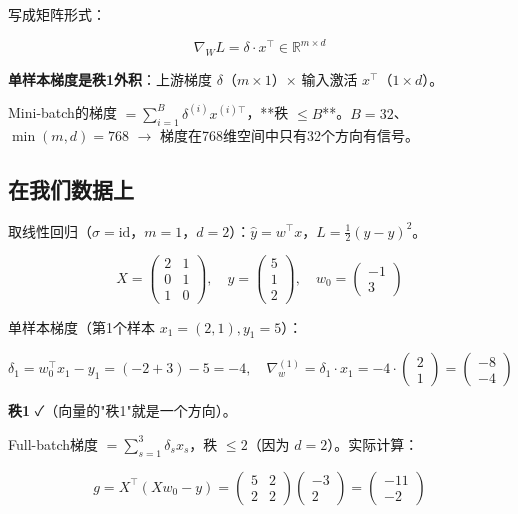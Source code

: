 \documentclass[12pt,a4paper]{article}
\begin{document}
写成矩阵形式：


\[\boxed{\nabla_W L = \delta \cdot x^\top \in \mathbb{R}^{m \times d}}\]

\textbf{单样本梯度是秩1外积}：上游梯度 $\delta$（$m \times 1$）$\times$ 输入激活 $x^\top$（$1 \times d$）。

Mini-batch的梯度 $= \sum_{i=1}^B \delta^{(i)} x^{(i)\top}$，**秩 $\le B$**。$B = 32$、$\min(m,d) = 768$ $\to$ 梯度在768维空间中只有32个方向有信号。


\subsection{在我们数据上}

取线性回归（$\sigma = \text{id}$，$m = 1$，$d = 2$）：$\hat{y} = w^\top x$，$L = \frac{1}{2}(\hat{y} - y)^2$。


\[X = \begin{pmatrix}2&1\\0&1\\1&0\end{pmatrix}, \quad y = \begin{pmatrix}5\\1\\2\end{pmatrix}, \quad w_0 = \begin{pmatrix}-1\\3\end{pmatrix}\]

单样本梯度（第1个样本 $x_1 = (2,1), y_1 = 5$）：


\[\delta_1 = w_0^\top x_1 - y_1 = (-2+3) - 5 = -4, \quad \nabla_w^{(1)} = \delta_1 \cdot x_1 = -4 \cdot \begin{pmatrix}2\\1\end{pmatrix} = \begin{pmatrix}-8\\-4\end{pmatrix}\]

\textbf{秩1} ✓（向量的"秩1"就是一个方向）。

Full-batch梯度 $= \sum_{s=1}^3 \delta_s x_s$，秩 $\le 2$（因为 $d=2$）。实际计算：


\[g = X^\top(Xw_0 - y) = \begin{pmatrix}5&2\\2&2\end{pmatrix}\begin{pmatrix}-3\\2\end{pmatrix} = \begin{pmatrix}-11\\-2\end{pmatrix}\]
\end{document}
